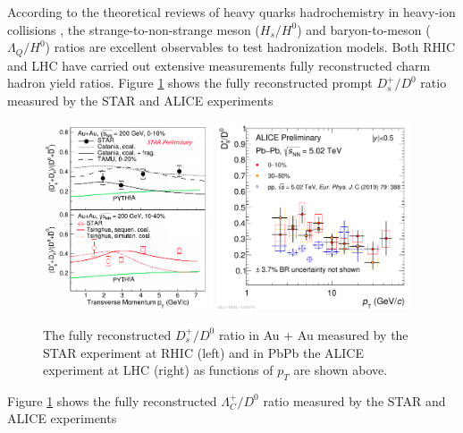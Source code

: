 According to the theoretical reviews of heavy quarks hadrochemistry in heavy-ion collisions \cite{StrangetoLight,BaryontoMeson}, the strange-to-non-strange meson ($H_s/H^0$) and baryon-to-meson ($\Lambda_{Q}/H^{0}$) ratios are excellent observables to test hadronization models. Both RHIC and LHC have carried out extensive measurements fully reconstructed charm hadron yield ratios. Figure \ref{HadroPlotCharm} shows the fully reconstructed prompt $D^+_s/D^0$ ratio measured by the STAR \cite{} and ALICE \cite{} experiments


\begin{figure}[hbtp]
\begin{center}
\includegraphics[width=0.45\textwidth]{Figures/Chapter2/STARDsD0.png}
\includegraphics[width=0.51\textwidth]{Figures/Chapter2/ALICEDsD0.pdf}
\caption{The fully reconstructed $D_s^+/D^0$ ratio in Au + Au measured by the STAR experiment at RHIC (left) and in PbPb the ALICE experiment at LHC (right) as functions of $p_T$ are shown above.}
\label{HadroPlotCharm}
\end{center}
\end{figure}   



Figure \ref{HadroPlotCharm} shows the fully reconstructed $\Lambda_C^+/D^0$ ratio measured by the STAR and ALICE experiments



